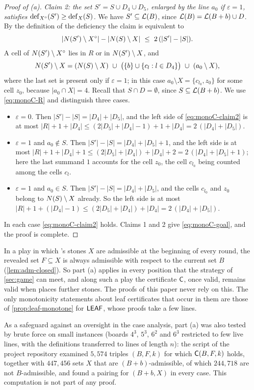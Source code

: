 \begin{proof}[Proof of \textup{(a)}]
\smallskip\noindent\emph{Claim 2: the set
$S'=S\cup D_4\cup D_5$, enlarged by the line $a_0$ if $\varepsilon=1$, satisfies
$\operatorname{def}_{X^\circ}(S')\ge\operatorname{def}_X(S)$.}
We have $S'\subseteq\mathcal{L}(B)$, since $\mathcal{L}(B)=\mathcal{L}(B+b)\cup D$. By the definition of the deficiency the
claim is equivalent to
\begin{equation}\label{eq:monoC-claim2}
  |N(S')\setminus X^\circ|-|N(S)\setminus X|\ \le\ 2\,(|S'|-|S|) .
\end{equation}
A cell of $N(S')\setminus X^\circ$ lies in $R$ or in $N(S')\setminus X$, and
\[
  \N(S')\setminus X=(\N(S)\setminus X)\ \cup\ \bigl(\{b\}\cup\{c_l : l\in D_4\}\bigr)\ \cup\ (a_0\setminus X),
\]
where the last set is present only if $\varepsilon=1$; in this case $a_0\setminus X=\{c_{l_0},z_0\}$ for
some cell $z_0$, because $|a_0\cap X|=4$. Recall that $S\cap D=\emptyset$, since $S\subseteq\mathcal{L}(B+b)$. We
use \eqref{eq:monoC-R} and distinguish three cases.
\begin{itemize}
\item $\varepsilon=0$. Then $|S'|-|S|=|D_4|+|D_5|$, and the left side of \eqref{eq:monoC-claim2} is at most
      $|R|+1+|D_4|\le(2|D_5|+|D_4|-1)+1+|D_4|=2\,(|D_4|+|D_5|)$.
\item $\varepsilon=1$ and $a_0\notin S$. Then $|S'|-|S|=|D_4|+|D_5|+1$, and the left side is at most
      $|R|+1+|D_4|+1\le(2|D_5|+|D_4|)+|D_4|+2=2\,(|D_4|+|D_5|+1)$; here the last summand $1$ accounts for
      the cell $z_0$, the cell $c_{l_0}$ being counted among the cells $c_l$.
\item $\varepsilon=1$ and $a_0\in S$. Then $|S'|-|S|=|D_4|+|D_5|$, and the cells $c_{l_0}$ and $z_0$ belong
      to $N(S)\setminus X$ already. So the left side is at most
      $|R|+1+(|D_4|-1)\le(2|D_5|+|D_4|)+|D_4|=2\,(|D_4|+|D_5|)$.
\end{itemize}
In each case \eqref{eq:monoC-claim2} holds. Claims 1 and 2 give \eqref{eq:monoC-goal}, and the proof is
complete.
\end{proof}

In a play in which \Maker's stones $X$ are admissible at the beginning of every round, the revealed set
$F\subseteq X$ is always admissible with respect to the current set $B$ (\cref{lem:adm-closed}). So part
(a) applies in every position that the strategy of \cref{sec:game} can meet, and along such a play the
certificate $\mathsf{C}$, once valid, remains valid when \Breaker{} places further stones. The proofs of this
paper never rely on this. The only monotonicity statements about leaf certificates that occur in them
are those of \cref{prop:leaf-monotone} for $\mathsf{LEAF}$, whose proofs take a few lines.

As a safeguard against an oversight in the case analysis, part (a) was also tested by brute force on
small instances (boards $4^3$, $5^3$, $6^2$ and $6^3$ restricted to few live lines, with the definitions
transferred to lines of length $n$): the script  of the project repository examined $5{,}574$ triples
$(B,F,k)$ for which $\mathsf{C}(B,F,k)$ holds, together with $447{,}456$ sets $X$ that are $(B+b)$-admissible, of
which $244{,}718$ are not $B$-admissible, and found a pairing for $(B+b,X)$ in every case. This
computation is not part of any proof.
